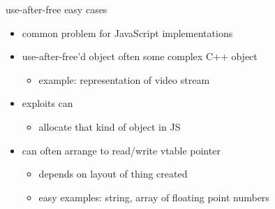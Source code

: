 
\begin{frame}{use-after-free easy cases}
\begin{itemize}
    \item common problem for JavaScript implementations
    \item use-after-free'd object often some complex C++ object
        \begin{itemize}
            \item example: representation of video stream
        \end{itemize}
    \item exploits can 
        \begin{itemize}
            \item allocate that kind of object in JS
        \end{itemize}
    \item can often arrange to read/write vtable pointer
        \begin{itemize}
            \item depends on layout of thing created
            \item easy examples: string, array of floating point numbers
        \end{itemize}
\end{itemize}
\end{frame}
